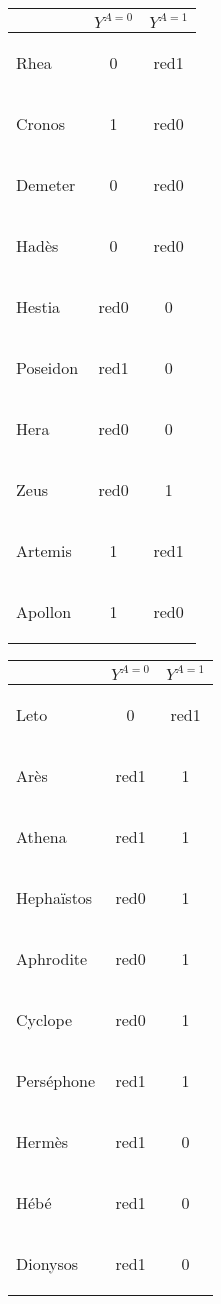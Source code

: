 \documentclass{standalone}
\newcommand{\dred}[1]{\begin{color}{red}{#1}\end{color}}
\begin{document}
	

\begin{tabular}{l|c|c|}
	& $Y^{A = 0} $ & $Y^{A = 1}$ \\
	\hline
	Rhea & 0 & \dred{1}\\
	Cronos & 1 & \dred{0}\\
	Demeter &0 & \dred{0}\\
	Hadès & 0 & \dred{0}\\
	Hestia & \dred{0} & 0\\
	Poseidon & \dred{1} & 0 \\
	Hera & \dred{0} & 0\\
	Zeus & \dred{0} &1 \\
	Artemis & 1 & \dred{1}\\
	Apollon& 1 & \dred{0}
\end{tabular}
\begin{tabular}{l|c|c|}
	& $Y^{A = 0} $ & $Y^{A = 1}$ \\
	\hline
	Leto & 0 & \dred{1}\\
	Arès & \dred{1}  & 1\\
	Athena & \dred{1}  & 1\\
	Hephaïstos & \dred{0}  & 1\\
	Aphrodite & \dred{0}  & 1 \\
	Cyclope & \dred{0}  & 1\\
	Perséphone & \dred{1}  & 1 \\
	Hermès &\dred{1} & 0\\
	Hébé &\dred{1} & 0 \\
	Dionysos &\dred{1} & 0
\end{tabular}
\end{document}
